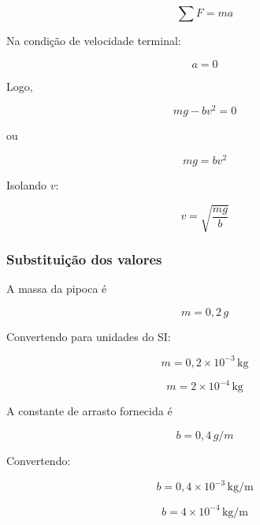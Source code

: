 \documentclass[a4paper,12pt]{article}
\begin{document}
\begin{equation}
\sum F = ma
\end{equation}

Na condição de velocidade terminal:

\begin{equation}
a=0
\end{equation}

Logo,

\begin{equation}
mg - b v^2 = 0
\end{equation}

ou

\begin{equation}
mg = b v^2
\end{equation}

Isolando \(v\):

\begin{equation}
v = \sqrt{\frac{mg}{b}}
\end{equation}

\subsubsection*{Substituição dos valores}

A massa da pipoca é

\begin{equation}
m = 0{,}2\,g
\end{equation}

Convertendo para unidades do SI:

\begin{equation}
m = 0{,}2 \times 10^{-3}\,\text{kg}
\end{equation}

\begin{equation}
m = 2 \times 10^{-4}\,\text{kg}
\end{equation}

A constante de arrasto fornecida é

\begin{equation}
b = 0{,}4\,g/m
\end{equation}

Convertendo:

\begin{equation}
b = 0{,}4 \times 10^{-3}\,\text{kg/m}
\end{equation}

\begin{equation}
b = 4 \times 10^{-4}\,\text{kg/m}
\end{equation}
\end{document}
